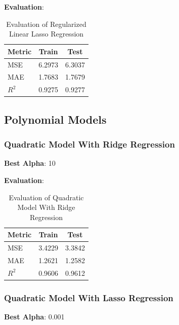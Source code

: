 \documentclass[a4paper,12pt]{article}
\begin{document}
\textbf{Evaluation}: 
\begin{table}[H]
    \centering
    \begin{tabular}{|l|c|c|}
    \hline
    \textbf{Metric} & \textbf{Train} & \textbf{Test} \\
    \hline
    MSE & 6.2973 & 6.3037 \\
    MAE & 1.7683 & 1.7679 \\
    $R^2$ & 0.9275 & 0.9277 \\
    \hline
    \end{tabular}
    \caption{Evaluation of Regularized Linear Lasso Regression}
    \label{tab:tab_6}
\end{table}    

\subsection*{Polynomial Models}

\subsubsection*{Quadratic Model With Ridge Regression}

\textbf{Best Alpha}: 10

\noindent\textbf{Evaluation}: 
\begin{table}[H]
    \centering
    \begin{tabular}{|l|c|c|}
    \hline
    \textbf{Metric} & \textbf{Train} & \textbf{Test} \\
    \hline
    MSE & 3.4229 & 3.3842 \\
    MAE & 1.2621 & 1.2582 \\
    $R^2$ & 0.9606 & 0.9612 \\
    \hline
    \end{tabular}
    \caption{Evaluation of Quadratic Model With Ridge Regression}
    \label{tab:tab_7}
\end{table}

\subsubsection*{Quadratic Model With Lasso Regression}

\textbf{Best Alpha}: 0.001
\end{document}
